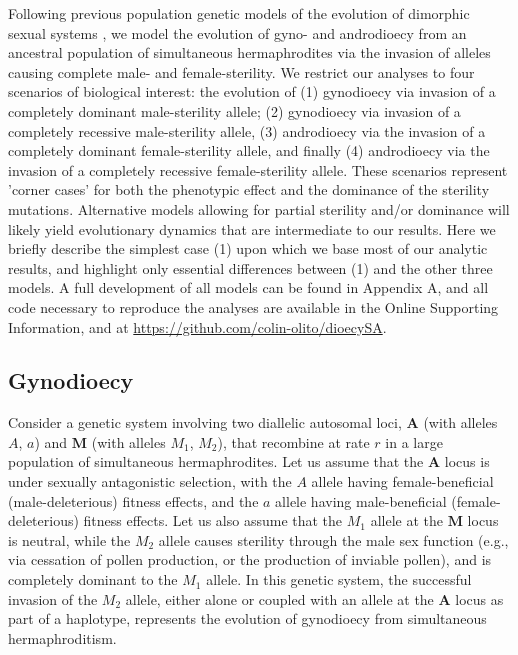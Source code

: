 \documentclass[9pt,twocolumn,twoside,lineno]{gsajnl}
\begin{document}
Following previous population genetic models of the evolution of dimorphic sexual systems \citep{Charlesworth1978}, we model the evolution of gyno- and androdioecy from an ancestral population of simultaneous hermaphrodites via the invasion of alleles causing complete male- and female-sterility. We restrict our analyses to four scenarios of biological interest: the evolution of (1) gynodioecy via invasion of a completely dominant male-sterility allele; (2) gynodioecy via invasion of a completely recessive male-sterility allele, (3) androdioecy via the invasion of a completely dominant female-sterility allele, and finally (4) androdioecy via the invasion of a completely recessive female-sterility allele. These scenarios represent 'corner cases' for both the phenotypic effect and the dominance of the sterility mutations. Alternative models allowing for partial sterility and/or dominance will likely yield evolutionary dynamics that are intermediate to our results. Here we briefly describe the simplest case (1) upon which we base most of our analytic results, and highlight only essential differences between (1) and the other three models. A full development of all models can be found in Appendix A, and all code necessary to reproduce the analyses are available in the Online Supporting Information, and at \url{https://github.com/colin-olito/dioecySA}.

\subsection{Gynodioecy}
Consider a genetic system involving two diallelic autosomal loci, $\mathbf{A}$ (with alleles $A$, $a$) and $\mathbf{M}$ (with alleles $M_1$, $M_2$), that recombine at rate $r$ in a large population of simultaneous hermaphrodites. Let us assume that the $\mathbf{A}$ locus is under sexually antagonistic selection, with the $A$ allele having female-beneficial (male-deleterious) fitness effects, and the $a$ allele having male-beneficial (female-deleterious) fitness effects. Let us also assume that the $M_1$ allele at the $\mathbf{M}$ locus is neutral, while the $M_2$ allele causes sterility through the male sex function (e.g., via cessation of pollen production, or the production of inviable pollen), and is completely dominant to the $M_1$ allele. In this genetic system, the successful invasion of the $M_2$ allele, either alone or coupled with an allele at the $\mathbf{A}$ locus as part of a haplotype, represents the evolution of gynodioecy from simultaneous hermaphroditism. 
\end{document}
